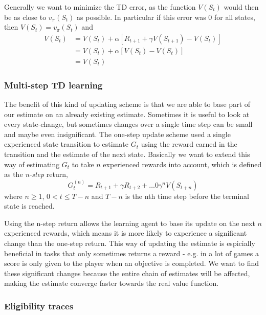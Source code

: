 \documentclass[11pt]{article}
\begin{document}
Generally we want to minimize the TD error, as the function $V(S_t)$
would then be as close to $v_\pi(S_t)$ as possible.
In particular if this error was 0 for all states, then
$V(S_t) = v_\pi(S_t)$ and
\begin{align}
   V(S_t)  & = V(S_t) + \alpha  [R_{t+1} + \gamma  V(S_{t+1}) - V(S_t)]   \\
           & = V(S_t) + \alpha  [V(S_t) - V(S_t)]  \\
           & = V(S_t) 
\end{align}

\subsubsection{Multi-step TD learning}

The benefit of this kind of updating scheme is that we are able to base
part of our estimate on an already existing estimate.
Sometimes it is useful to look at every state-change, but sometimes
changes over a single time step can be small and maybe even insignificant.
The one-step update scheme used a single experienced state transition to estimate
$G_t$ using the reward earned in the transition and the estimate of the
next state.
Basically we want to extend this way of estimating $G_t$ to take $n$ experienced rewards
into account, which is defined as the \textit{n-step} return,
\begin{equation}
    G^{(n)}_t = R_{t+1} + \gamma R_{t+2} + \dots 0 \gamma^n V(S_{t+n})
\end{equation}
where $n \geq 1$, $0 < t \leq T - n$ and $T - n$ is the nth time step before the terminal state
is reached.

Using the n-step return allows the learning agent to base its update on the next $n$ experienced
rewards, which means it is more likely to experience a significant change than the one-step return.
This way of updating the estimate is espicially beneficial in tasks that only sometimes returns a reward
- e.g. in a lot of games a score is only given to the player when an objective is completed.
We want to find these significant changes because the entire chain of estimates 
will be affected, making the estimate converge faster towards the real value function.

\subsubsection{Eligibility traces}\label{sec:eligibility_traces}
\end{document}
